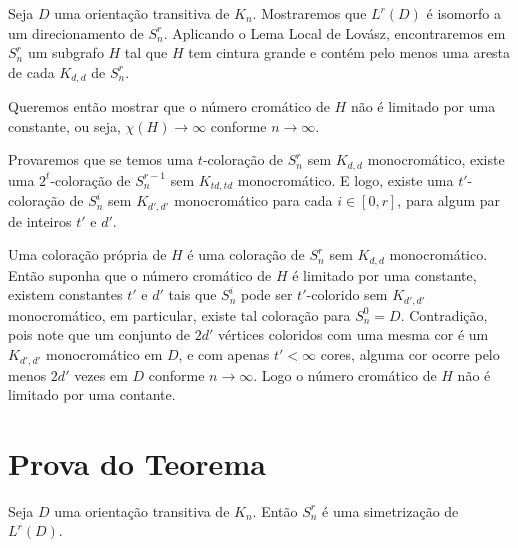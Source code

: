 Seja $D$ uma orientação transitiva de $K_n$. Mostraremos que $L^r(D)$ é isomorfo a um direcionamento de $S_n^r$. Aplicando o Lema Local de Lovász, encontraremos em $S_n^r$ um subgrafo $H$ tal que $H$ tem cintura grande e contém pelo menos uma aresta de cada $K_{d,d}$ de $S_n^r$.

Queremos então mostrar que o número cromático de $H$ não é limitado por uma constante, ou seja, $\chi(H) \rightarrow \infty$ conforme $n \rightarrow \infty$.

Provaremos que se temos uma $t$-coloração de $S_n^r$ sem $K_{d,d}$ monocromático, existe uma $2^t$-coloração de $S_n^{r-1}$ sem $K_{td,td}$ monocromático. E logo, existe uma $t'$-coloração de $S_n^i$ sem $K_{d',d'}$ monocromático para cada $i\in [0,r]$, para algum par de inteiros $t'$ e $d'$.

Uma coloração própria de $H$ é uma coloração de $S_n^r$ sem $K_{d,d}$ monocromático. Então suponha que o número cromático de $H$ é limitado por uma constante, existem constantes $t'$ e $d'$ tais que $S_n^i$ pode ser $t'$-colorido sem $K_{d',d'}$ monocromático, em particular, existe tal coloração para $S_n^0 = D$. Contradição, pois note que um conjunto de $2d'$ vértices coloridos com uma mesma cor é um $K_{d',d'}$ monocromático em $D$, e com apenas $t' < \infty$ cores, alguma cor ocorre pelo menos $2d'$ vezes em $D$ conforme $n\rightarrow\infty$. Logo o número cromático de $H$ não é limitado por uma contante.

\section{Prova do Teorema}

\begin{afirmacao}\label{shiftafirm1}
Seja $D$ uma orientação transitiva de $K_n$. Então $S_n^r$ é uma simetrização de $L^r(D)$.
\end{afirmacao}

